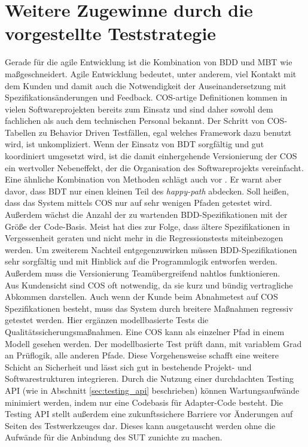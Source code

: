 \section{Weitere Zugewinne durch die vorgestellte Teststrategie}
Gerade für die agile Entwicklung ist die Kombination von BDD und \Gls{MBT} wie maßgeschneidert. Agile Entwicklung bedeutet, unter anderem, viel Kontakt mit dem Kunden und damit auch die Notwendigkeit der Auseinandersetzung mit Spezifikationsänderungen und Feedback. \Gls{COS}-artige Definitionen kommen in vielen Softwareprojekten bereits zum Einsatz und sind daher sowohl dem fachlichen als auch dem technischen Personal bekannt. Der Schritt von \Gls{COS}-Tabellen zu Behavior Driven Testfällen, egal welches Framework dazu benutzt wird, ist unkompliziert. Wenn der Einsatz von \Gls{BDT} sorgfältig und gut koordiniert umgesetzt wird, ist die damit einhergehende Versionierung der \Gls{COS} ein wertvoller Nebeneffekt, der die Organisation des Softwareprojekts vereinfacht.\\
Eine ähnliche Kombination von Methoden schlägt auch \citeauthor{binder_model-based_2014} vor \cite{binder_model-based_2014}. Er warnt aber davor, dass \Gls{BDT} nur einen kleinen Teil des \textit{happy-path} abdecken. Soll heißen, dass das System mittels \Gls{COS} nur auf sehr wenigen Pfaden getestet wird. Außerdem wächst die Anzahl der zu wartenden \Gls{BDD}-Spezifikationen mit der Größe der Code-Basis. Meist hat dies zur Folge, dass ältere Spezifikationen in Vergessenheit geraten und nicht mehr in die Regressionstests miteinbezogen werden. Um zweiterem Nachteil entgegenzuwirken müssen \Gls{BDD}-Spezifikationen sehr sorgfältig und mit Hinblick auf die Programmlogik entworfen werden. Außerdem muss die Versionierung Teamübergreifend nahtlos funktionieren.\\
Aus Kundensicht sind \Gls{COS} oft notwendig, da sie kurz und bündig vertragliche Abkommen darstellen. Auch wenn der Kunde beim Abnahmetest auf \Gls{COS} Spezifikationen besteht, muss das System durch breitere Maßnahmen regressiv getestet werden. Hier ergänzen modellbasierte Tests die Qualitätssicherungsmaßnahmen. Eine \Gls{COS} kann als einzelner Pfad in einem Modell gesehen werden. Der modellbasierte Test prüft dann, mit variablem Grad an Prüflogik, alle anderen Pfade. Diese Vorgehensweise schafft eine weitere Schicht an Sicherheit und lässt sich gut in bestehende Projekt- und Softwarestrukturen integrieren. Durch die Nutzung einer durchdachten Testing API (wie in Abschnitt \ref{sec:testing_api} beschrieben) können Wartungsaufwände minimiert werden, indem nur eine Codebasis für Adapter-Code besteht. Die Testing API stellt außerdem eine zukunftssichere Barriere vor Änderungen auf Seiten des Testwerkzeuges dar. Dieses kann ausgetauscht werden ohne die Aufwände für die Anbindung des \Gls{SUT} zunichte zu machen.\\
